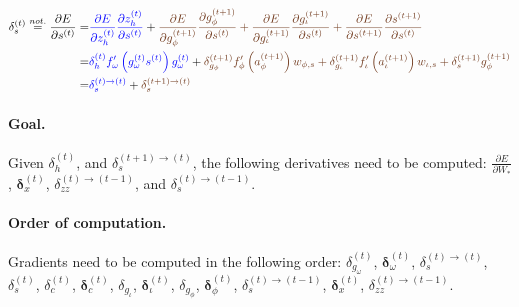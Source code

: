 \documentclass[11pt]{article}
\begin{document}
\begin{equation}
\begin{split}
    \delta_{s}^{(t)} \overset{not.}{=} \displaystyle\frac{\partial E}{\partial s^{(t)}} = &
    {\color{blue} \displaystyle\frac{\partial E}{\partial z_h^{(t)}}
    \displaystyle\frac{\partial z_h^{(t)}}{\partial s^{(t)}}} +
    {\color{auburn}\displaystyle\frac{\partial E}{\partial g_{\phi}^{(t+1)}}
    \displaystyle\frac{\partial g_{\phi}^{(t+1)}}{\partial s^{(t)}} +
    \displaystyle\frac{\partial E}{\partial g_{\iota}^{(t+1)}}
    \displaystyle\frac{\partial g_{\iota}^{(t+1)}}{\partial s^{(t)}} +
    \displaystyle\frac{\partial E}{\partial s^{(t+1)}}
    \displaystyle\frac{\partial s^{(t+1)}}{\partial s^{(t)}}} \\
    = & {\color{blue} \delta_{h}^{(t)} f_{\omega}'\left(g_{\omega}^{(t)}s^{(t)}\right) g_{\omega}^{(t)}} +
        {\color{auburn}\delta_{g_{\phi}}^{(t+1)}f_{\phi}'\left(a_{\phi}^{(t+1)}\right)w_{\phi, s} +
        \delta_{g_{\iota}}^{(t+1)}f_{\iota}'\left(a_{\iota}^{(t+1)}\right)w_{\iota, s} +
        \delta_{s}^{(t+1)}g_{\phi}^{(t+1)}} \\
    = & {\color{blue}\delta^{(t) \rightarrow (t)}_s} +
        {\color{auburn}\delta^{(t+1) \rightarrow (t)}_s}
\end{split}
\end{equation}

\paragraph{Goal.} Given $\delta_h^{(t)}$, and $\delta^{(t+1) \rightarrow (t)}_s$, the following derivatives need to be computed: $\displaystyle \frac{\partial E}{\partial W_{*}}$, $\boldsymbol{\delta}_x^{(t)}$, $\delta_{zz}^{(t)\rightarrow(t-1)}$, and $\delta^{(t) \rightarrow (t-1)}_s$.

\paragraph{Order of computation.}
Gradients need to be computed in the following order: $\delta_{g_{\omega}}^{(t)}$, $\boldsymbol{\delta}_{\omega}^{(t)}$, $\delta_s^{(t) \rightarrow (t)}$, $\delta_s^{(t)}$, $\delta_c^{(t)}$, $\boldsymbol{\delta}_{c}^{(t)}$, $\delta_{g_{\iota}}$, $\boldsymbol{\delta}_{\iota}^{(t)}$, $\delta_{g_{\phi}}$, $\boldsymbol{\delta}_{\phi}^{(t)}$,
$\delta_s^{(t) \rightarrow (t-1)}$, $\boldsymbol{\delta}_x^{(t)}$, $\delta_{zz}^{(t)\rightarrow(t-1)}$.
\end{document}
